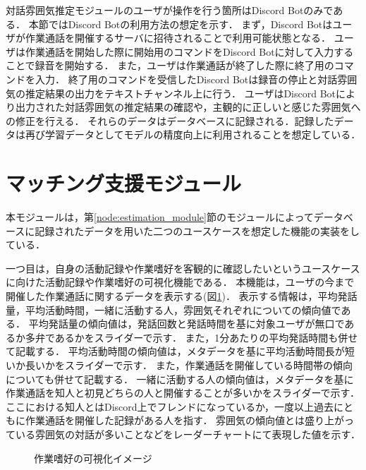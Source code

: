 対話雰囲気推定モジュールのユーザが操作を行う箇所はDiscord Botのみである．
本節ではDiscord Botの利用方法の想定を示す．
まず，Discord Botはユーザが作業通話を開催するサーバに招待されることで利用可能状態となる．
ユーザは作業通話を開始した際に開始用のコマンドをDiscord Botに対して入力することで録音を開始する．
また，ユーザは作業通話が終了した際に終了用のコマンドを入力．
終了用のコマンドを受信したDiscord Botは録音の停止と対話雰囲気の推定結果の出力をテキストチャンネル上に行う．
ユーザはDiscord Botにより出力された対話雰囲気の推定結果の確認や，主観的に正しいと感じた雰囲気への修正を行える．
それらのデータはデータベースに記録される．記録したデータは再び学習データとしてモデルの精度向上に利用されることを想定している．

\section{マッチング支援モジュール}

本モジュールは，第\ref{node:estimation_module}節のモジュールによってデータベースに記録されたデータを用いた二つのユースケースを想定した機能の実装をしている．

一つ目は，自身の活動記録や作業嗜好を客観的に確認したいというユースケースに向けた活動記録や作業嗜好の可視化機能である．
本機能は，ユーザの今まで開催した作業通話に関するデータを表示する(図\ref{fig:estimationgraph})．
表示する情報は，平均発話量，平均活動時間，一緒に活動する人，雰囲気それぞれについての傾向値である．
平均発話量の傾向値は，発話回数と発話時間を基に対象ユーザが無口であるか多弁であるかをスライダーで示す．
また，1分あたりの平均発話時間も併せて記載する．
平均活動時間の傾向値は，メタデータを基に平均活動時間長が短いか長いかをスライダーで示す．
また，作業通話を開催している時間帯の傾向についても併せて記載する．
一緒に活動する人の傾向値は，メタデータを基に作業通話を知人と初見どちらの人と開催することが多いかをスライダーで示す．
ここにおける知人とはDiscord上でフレンドになっているか，一度以上過去にともに作業通話を開催した記録がある人を指す．
雰囲気の傾向値とは盛り上がっている雰囲気の対話が多いことなどをレーダーチャートにて表現した値を示す．

\begin{figure}
    \centering
    \caption{作業嗜好の可視化イメージ}
    \label{fig:estimationgraph}
\end{figure}

